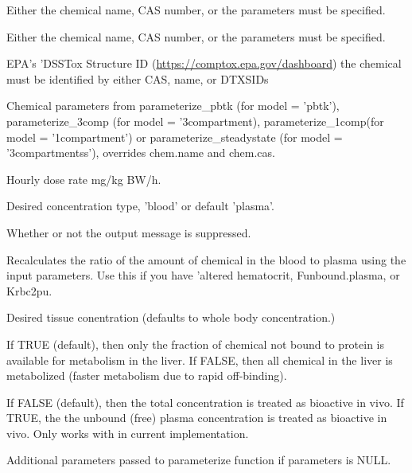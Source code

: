 \documentclass[a4paper]{book}
\begin{document}
\begin{Arguments}
\begin{ldescription}
\item[\code{chem.name}] Either the chemical name, CAS number, or the parameters must 
be specified.

\item[\code{chem.cas}] Either the chemical name, CAS number, or the parameters must 
be specified.

\item[\code{dtxsid}] EPA's 'DSSTox Structure ID (\url{https://comptox.epa.gov/dashboard})
the chemical must be identified by either CAS, name, or DTXSIDs

\item[\code{parameters}] Chemical parameters from parameterize\_pbtk (for model = 
'pbtk'), parameterize\_3comp (for model = '3compartment), 
parameterize\_1comp(for model = '1compartment') or parameterize\_steadystate 
(for model = '3compartmentss'), overrides chem.name and chem.cas.

\item[\code{hourly.dose}] Hourly dose rate mg/kg BW/h.

\item[\code{concentration}] Desired concentration type, 'blood' or default 'plasma'.

\item[\code{suppress.messages}] Whether or not the output message is suppressed.

\item[\code{recalc.blood2plasma}] Recalculates the ratio of the amount of chemical 
in the blood to plasma using the input parameters. Use this if you have 
'altered hematocrit, Funbound.plasma, or Krbc2pu.

\item[\code{tissue}] Desired tissue conentration (defaults to whole body 
concentration.)

\item[\code{restrictive.clearance}] If TRUE (default), then only the fraction of
chemical not bound to protein is available for metabolism in the liver. If 
FALSE, then all chemical in the liver is metabolized (faster metabolism due
to rapid off-binding).

\item[\code{bioactive.free.invivo}] If FALSE (default), then the total concentration is treated
as bioactive in vivo. If TRUE, the the unbound (free) plasma concentration is treated as 
bioactive in vivo. Only works with  in current implementation.

\item[\code{...}] Additional parameters passed to parameterize function if 
parameters is NULL.
\end{ldescription}
\end{Arguments}
\end{document}
